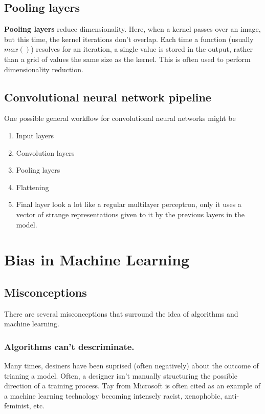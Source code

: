\documentclass[titlepage, 12pt, leqno]{article}
\begin{document}
\subsection{Pooling layers}
\textbf{Pooling layers} reduce dimensionality. Here, when a kernel passes over 
an image, but this time, the kernel iterations don't overlap. Each time a
function (usually $max()$) resolves for an iteration, a single value is stored
in the output, rather than a grid of values the same size as the kernel. This
is often used to perform dimensionality reduction.

\subsection{Convolutional neural network pipeline}
One possible general workflow for convolutional neural networks might be
\begin{enumerate}
    \item Input layers
    \item Convolution layers
    \item Pooling layers
    \item Flattening
    \item Final layer look a lot like a regular multilayer perceptron, only
        it uses a vector of strange representations given to it by the previous
        layers in the model.
\end{enumerate}

\pagebreak
\section{Bias in Machine Learning}
\subsection{Misconceptions}
There are several misconceptions that surround the idea of algorithms and 
machine learning.

\subsubsection{Algorithms can't descriminate.}
Many times, desiners have been suprised (often negatively) about the outcome of
trianing a model. Often, a designer isn't manually structuring the possible
direction of a training process. Tay from Microsoft is often cited as an
example of a machine learning technology becoming intensely racist, xenophobic,
anti-feminist, etc.
\end{document}
